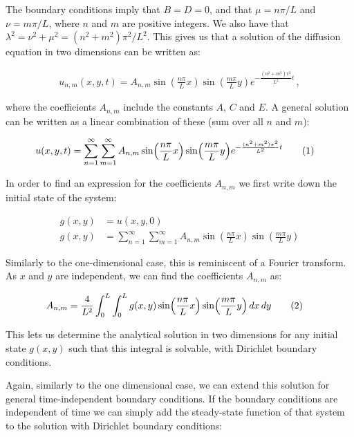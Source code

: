 \documentclass[reprint,english,notitlepage]{revtex4-1}  %
\newcommand\numberthis{\addtocounter{equation}{1}\tag{\theequation}}
\begin{document}
The boundary conditions imply that $B=D=0$, and that $\mu = n\pi/L$ and $\nu = m\pi/L$, where $n$ and $m$ are positive integers. We also have that $\lambda^2 = \nu^2 + \mu^2 = (n^2+m^2) \pi^2/L^2$. This gives us that a solution of the diffusion equation in two dimensions can be written as:

\begin{align*}
u_{n,m}(x,y,t) = A_{n,m} \sin (\frac{n\pi}{L} x)  \sin (\frac{m\pi}{L} y) e^{-\frac{(n^2 + m^2)\pi^2}{L^2} t} \, ,
\end{align*}

where the coefficients $A_{n,m}$ include the constants $A$, $C$ and $E$. A general solution can be written as a linear combination of these (sum over all $n$ and $m$):

\begin{align*}
u(x,y,t) &= \sum\limits_{n=1}^\infty \sum\limits_{m=1}^\infty A_{n,m} \sin (\frac{n\pi}{L} x)  \sin (\frac{m\pi}{L} y) e^{-\frac{(n^2 + m^2)\pi^2}{L^2} t} \numberthis \label{eq:2D_diffusion_equation_analytical_solution}
\end{align*} 

In order to find an expression for the coefficients $A_{n,m}$ we first write down the initial state of the system:

\begin{align*}
g(x,y) &= u(x,y,0) \\
g(x,y) &= \sum\limits_{n=1}^\infty \sum\limits_{m=1}^\infty A_{n,m} \sin (\frac{n\pi}{L} x)  \sin (\frac{m\pi}{L} y)
\end{align*}

Similarly to the one-dimensional case, this is reminiscent of a Fourier transform. As $x$ and $y$ are independent, we can find the coefficients $A_{n,m}$ as:

\begin{align*}
A_{n,m} &= \frac{4}{L^2} \int_0^L \int_0^L g(x,y) \sin( \frac{n\pi}{L} x) \sin (\frac{m\pi}{L} y) \, dx \, dy \numberthis \label{eq:2D_diffusion_equation_analytical_coefficients}
\end{align*}

This lets us determine the analytical solution in two dimensions for any initial state $g(x,y)$ such that this integral is solvable, with Dirichlet boundary conditions.

Again, similarly to the one dimensional case, we can extend this solution for general time-independent boundary conditions. If the boundary conditions are independent of time we can simply add the steady-state function of that system to the solution with Dirichlet boundary conditions:
\end{document}
